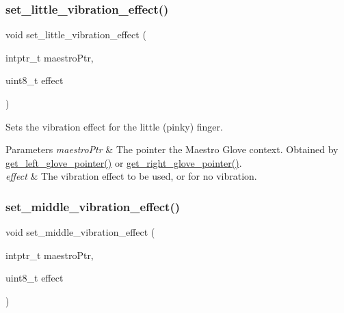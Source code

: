 \subsubsection{\texorpdfstring{set\+\_\+little\+\_\+vibration\+\_\+effect()}{set\_little\_vibration\_effect()}}
{\footnotesize\ttfamily void set\+\_\+little\+\_\+vibration\+\_\+effect (\begin{DoxyParamCaption}\item[{intptr\+\_\+t}]{maestro\+Ptr,  }\item[{uint8\+\_\+t}]{effect }\end{DoxyParamCaption})}

Sets the vibration effect for the little (pinky) finger. 
\begin{DoxyParams}{Parameters}
{\em maestro\+Ptr} & The pointer the Maestro Glove context. Obtained by \hyperlink{group__glove_context_access_ga63ce3c99d4a8b8db851b22af9185764e}{get\+\_\+left\+\_\+glove\+\_\+pointer()} or \hyperlink{group__glove_context_access_ga9b8fd9d91aeac3f8da50f7a7eba0c32b}{get\+\_\+right\+\_\+glove\+\_\+pointer()}. \\
\hline
{\em effect} & The vibration effect to be used, or {} for no vibration. \\
\hline
\end{DoxyParams}
\mbox{\label{group__strong_gac5e818c55bae4cc053575cf56da645f6}} 
\subsubsection{\texorpdfstring{set\+\_\+middle\+\_\+vibration\+\_\+effect()}{set\_middle\_vibration\_effect()}}
{\footnotesize\ttfamily void set\+\_\+middle\+\_\+vibration\+\_\+effect (\begin{DoxyParamCaption}\item[{intptr\+\_\+t}]{maestro\+Ptr,  }\item[{uint8\+\_\+t}]{effect }\end{DoxyParamCaption})}

